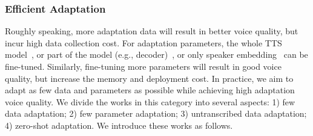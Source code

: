 \documentclass{article}
\begin{document}
\subsubsection{Efficient Adaptation}
Roughly speaking, more adaptation data will result in better voice quality, but incur high data collection cost. For adaptation parameters, the whole TTS model~\cite{chen2018sample,kons2019high}, or part of the model (e.g., decoder)~\cite{moss2020boffin,zhang2020adadurian}, or only speaker embedding~\cite{arik2018neural,chen2018sample,chen2021adaspeech} can be fine-tuned. Similarly, fine-tuning more parameters will result in good voice quality, but increase the memory and deployment cost. In practice, we aim to adapt as few data and parameters as possible while achieving high adaptation voice quality. We divide the works in this category into several aspects: 1) few data adaptation; 2) few parameter adaptation; 3) untranscribed data adaptation; 4) zero-shot adaptation. We introduce these works as follows.
\end{document}
